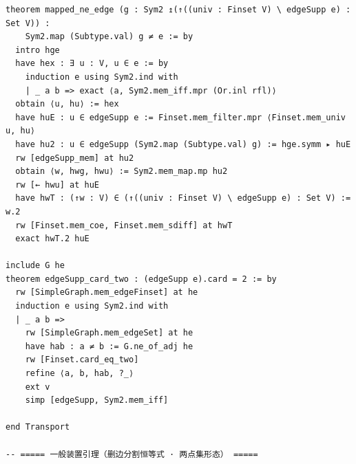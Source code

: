 \documentclass[11pt]{article}
\theoremstyle{definition}
\begin{document}
\begin{lstlisting}
theorem mapped_ne_edge (g : Sym2 ↥(↑((univ : Finset V) \ edgeSupp e) : Set V)) :
    Sym2.map (Subtype.val) g ≠ e := by
  intro hge
  have hex : ∃ u : V, u ∈ e := by
    induction e using Sym2.ind with
    | _ a b => exact ⟨a, Sym2.mem_iff.mpr (Or.inl rfl)⟩
  obtain ⟨u, hu⟩ := hex
  have huE : u ∈ edgeSupp e := Finset.mem_filter.mpr ⟨Finset.mem_univ u, hu⟩
  have hu2 : u ∈ edgeSupp (Sym2.map (Subtype.val) g) := hge.symm ▸ huE
  rw [edgeSupp_mem] at hu2
  obtain ⟨w, hwg, hwu⟩ := Sym2.mem_map.mp hu2
  rw [← hwu] at huE
  have hwT : (↑w : V) ∈ (↑((univ : Finset V) \ edgeSupp e) : Set V) := w.2
  rw [Finset.mem_coe, Finset.mem_sdiff] at hwT
  exact hwT.2 huE

include G he
theorem edgeSupp_card_two : (edgeSupp e).card = 2 := by
  rw [SimpleGraph.mem_edgeFinset] at he
  induction e using Sym2.ind with
  | _ a b =>
    rw [SimpleGraph.mem_edgeSet] at he
    have hab : a ≠ b := G.ne_of_adj he
    rw [Finset.card_eq_two]
    refine ⟨a, b, hab, ?_⟩
    ext v
    simp [edgeSupp, Sym2.mem_iff]

end Transport

-- ===== 一般装置引理（删边分割恒等式 · 两点集形态） =====


\end{lstlisting}
\end{document}
